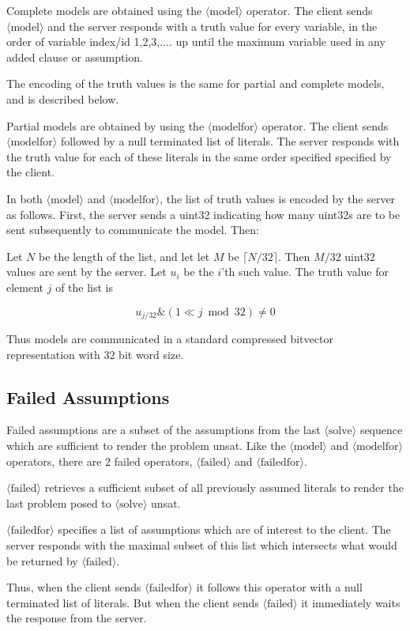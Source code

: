 \documentclass{article}
\newcommand\proto[1]{$\langle\mbox{#1}\rangle$}
\begin{document}
Complete models are obtained using the \proto{model} operator.  The client
sends \proto{model} and the server responds with a truth value for every variable,
in the order of variable index/id 1,2,3,.... up until the maximum
variable used in any added clause or assumption.

The encoding of the truth values is the same for partial and complete models,
and is described below.

Partial models are obtained by using the \proto{modelfor} operator.  The
client sends \proto{modelfor} followed by a null terminated list of literals.
The server responds with the truth value for each of these literals in
the same order specified specified by the client.

In both \proto{model} and \proto{modelfor}, the list of truth values is encoded by the
server as follows.  First, the server sends a uint32 indicating how many
uint32s are to be sent subsequently to communicate the model.  Then:

Let $N$ be the length of the list, and let let $M$ be $\lceil{N/32}\rceil$.
 Then $M/32$ uint32 values are sent by the server.  Let $u_i$ be the $i$'th such value.
 The truth value for element $j$ of the list is

 $$u_{j/32} \& (1 \ll j\bmod 32) \neq 0$$

Thus models are communicated in a standard compressed bitvector representation
with $32$ bit word size.

\subsection{Failed Assumptions}
Failed assumptions are a subset of the assumptions from the last \proto{solve}
sequence which are sufficient to render the problem unsat.  Like the \proto{model}
and \proto{modelfor} operators, there are 2 failed operators, \proto{failed} and
\proto{failedfor}.

\proto{failed} retrieves a sufficient subset of all previously
assumed literals to render the last problem posed to \proto{solve} unsat.

\proto{failedfor} specifies a list of assumptions which are of interest to the
client.  The server responds with the maximal subset of this list which
intersects what would be returned by \proto{failed}.

Thus, when the client sends \proto{failedfor} it follows this operator with
a null terminated list of literals. But when the client sends \proto{failed}
it immediately waits the response from the server.
\end{document}
